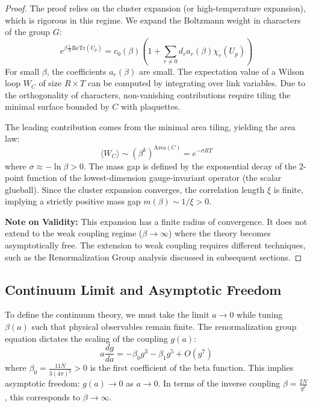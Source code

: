 \begin{proof}
    The proof relies on the cluster expansion (or high-temperature expansion), which is rigorous in this regime. We expand the Boltzmann weight in characters of the group $G$:
    \begin{equation}
        e^{\beta \frac{1}{N} \text{Re} \text{Tr}(U_p)} = c_0(\beta) \left( 1 + \sum_{r \neq 0} d_r a_r(\beta) \chi_r(U_p) \right)
    \end{equation}
    For small $\beta$, the coefficients $a_r(\beta)$ are small. The expectation value of a Wilson loop $W_C$ of size $R \times T$ can be computed by integrating over link variables. Due to the orthogonality of characters, non-vanishing contributions require tiling the minimal surface bounded by $C$ with plaquettes.
    
    The leading contribution comes from the minimal area tiling, yielding the area law:
    \begin{equation}
        \langle W_C \rangle \sim (\beta^k)^{\text{Area}(C)} = e^{-\sigma R T}
    \end{equation}
    where $\sigma \approx - \ln \beta > 0$. The mass gap is defined by the exponential decay of the 2-point function of the lowest-dimension gauge-invariant operator (the scalar glueball). Since the cluster expansion converges, the correlation length $\xi$ is finite, implying a strictly positive mass gap $m(\beta) \sim 1/\xi > 0$.
    
    \textbf{Note on Validity:} This expansion has a finite radius of convergence. It does not extend to the weak coupling regime ($\beta \to \infty$) where the theory becomes asymptotically free. The extension to weak coupling requires different techniques, such as the Renormalization Group analysis discussed in subsequent sections.
\end{proof}

\subsection{Continuum Limit and Asymptotic Freedom}

To define the continuum theory, we must take the limit $a \to 0$ while tuning $\beta(a)$ such that physical observables remain finite. The renormalization group equation dictates the scaling of the coupling $g(a)$:
\begin{equation}
    a \frac{dg}{da} = -\beta_0 g^3 - \beta_1 g^5 + O(g^7)
\end{equation}
where $\beta_0 = \frac{11N}{3(4\pi)^2} > 0$ is the first coefficient of the beta function. This implies asymptotic freedom: $g(a) \to 0$ as $a \to 0$.
In terms of the inverse coupling $\beta = \frac{2N}{g^2}$, this corresponds to $\beta \to \infty$.


